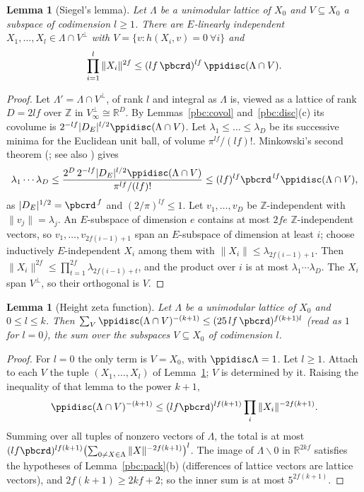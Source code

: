 \documentclass[10pt]{amsart}
\newtheorem{lemma}[theorem]{Lemma}
\theoremstyle{definition}
\theoremstyle{remark}
\newcommand{\R}{\mathbb R}
\newcommand{\Z}{\mathbb Z}
\begin{document}
\begin{lemma}[Siegel's lemma]\label{pbc:siegel}
Let $\Lambda$ be a unimodular lattice of $X_0$ and $V\subseteq X_0$ a subspace of codimension $l\ge1$. There
are $E$-linearly independent $X_1,\dots,X_l\in\Lambda\cap V^\perp$ with $V=\{v:h(X_i,v)=0\ \forall i\}$ and
\[
\prod_{i=1}^l\|X_i\|^{2f}\le(lf\,\pbcrd)^{lf}\,\ppidisc(\Lambda\cap V).
\]
\end{lemma}
\begin{proof}
Let $\Lambda'=\Lambda\cap V^\perp$, of rank $l$ and integral as $\Lambda$ is, viewed as a lattice of rank $D=2lf$ over $\Z$ in $V^\perp_\infty
\cong\R^D$. By Lemmas~\ref{pbc:covol} and~\ref{pbc:disc}(c) its covolume is $2^{-lf}|D_E|^{l/2}\ppidisc
(\Lambda\cap V)$. Let $\lambda_1\le\dots\le\lambda_D$ be its successive minima for the Euclidean unit ball, of
volume $\pi^{lf}/(lf)!$. Minkowski's second theorem (\cite[Chapter~VIII, \S4.3, Theorem~V]{Cassels}; see also \cite[Theorem~1.3]{HenkMinima}) gives
\[
\lambda_1\cdots\lambda_D\le\frac{2^D\,2^{-lf}|D_E|^{l/2}\ppidisc(\Lambda\cap V)}{\pi^{lf}/(lf)!}\le(lf)^{lf}
\pbcrd^{\,lf}\ppidisc(\Lambda\cap V),
\]
as $|D_E|^{1/2}=\pbcrd^{\,f}$ and $(2/\pi)^{lf}\le1$. Let $v_1,\dots,v_D$ be $\Z$-independent with $\|v_j\|=
\lambda_j$. An $E$-subspace of dimension $e$ contains at most $2fe$ $\Z$-independent vectors, so
$v_1,\dots,v_{2f(i-1)+1}$ span an $E$-subspace of dimension at least $i$; choose inductively
$E$-independent $X_i$ among them with $\|X_i\|\le\lambda_{2f(i-1)+1}$. Then $\|X_i\|^{2f}\le\prod_{t=1}^{2f}
\lambda_{2f(i-1)+t}$, and the product over $i$ is at most $\lambda_1\cdots\lambda_D$. The $X_i$ span
$V^\perp$, so their orthogonal is $V$.
\end{proof}

\begin{lemma}[Height zeta function]\label{pbc:height}
Let $\Lambda$ be a unimodular lattice of $X_0$ and $0\le l\le k$. Then $\sum_V\ppidisc(\Lambda\cap V)^{-(k+1)}
\le(25\,lf\,\pbcrd)^{f(k+1)l}$ (read as $1$ for $l=0$), the sum over the subspaces $V\subseteq X_0$ of
codimension $l$.
\end{lemma}
\begin{proof}
For $l=0$ the only term is $V=X_0$, with $\ppidisc\Lambda=1$. Let $l\ge1$. Attach to each $V$ the tuple
$(X_1,\dots,X_l)$ of Lemma~\ref{pbc:siegel}; $V$ is determined by it. Raising the inequality of that
lemma to the power $k+1$,
\[
\ppidisc(\Lambda\cap V)^{-(k+1)}\le(lf\pbcrd)^{lf(k+1)}\prod_i\|X_i\|^{-2f(k+1)} .
\]
Summing over all tuples of nonzero vectors of $\Lambda$, the total is at most $(lf\pbcrd)^{lf(k+1)}
\bigl(\sum_{0\ne X\in\Lambda}\|X\|^{-2f(k+1)}\bigr)^l$. The image of $\Lambda\smallsetminus0$ in $\R^{2kf}$
satisfies the hypotheses of Lemma~\ref{pbc:pack}(b) (differences of lattice vectors are lattice vectors),
and $2f(k+1)\ge2kf+2$; so the inner sum is at most $5^{2f(k+1)}$.
\end{proof}
\end{document}
